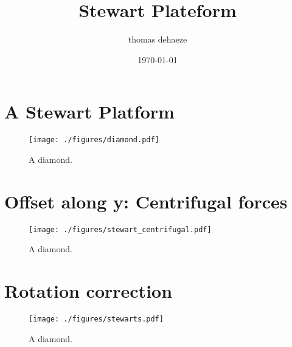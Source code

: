 \documentclass[11pt]{article}
\author{thomas dehaeze}
\date{\today}
\title{Stewart Plateform}
\begin{document}
\maketitle
\tableofcontents


\section{A Stewart Platform}
\label{sec:org88b2e29}

\begin{figure}[htbp]
\centering
\texttt{[image: ./figures/diamond.pdf]}
\caption{\label{fig:stewart}
A diamond.}
\end{figure}

\section{Offset along y: Centrifugal forces}
\label{sec:org345a22c}

\begin{figure}[htbp]
\centering
\texttt{[image: ./figures/stewart\_centrifugal.pdf]}
\caption{\label{fig:stewart_centrifugal}
A diamond.}
\end{figure}

\section{Rotation correction}
\label{sec:orga7c5b76}

\begin{figure}[htbp]
\centering
\texttt{[image: ./figures/stewarts.pdf]}
\caption{\label{fig:stewarts}
A diamond.}
\end{figure}
\end{document}
